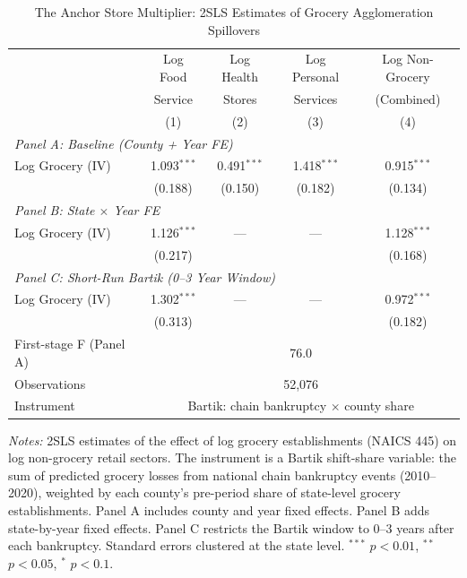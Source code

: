 \begin{table}[htbp]
\centering
\caption{The Anchor Store Multiplier: 2SLS Estimates of Grocery Agglomeration Spillovers}
\label{tab:iv}
\small
\begin{tabular}{lcccc}
\hline\hline
 & Log Food & Log Health & Log Personal & Log Non-Grocery \\
 & Service & Stores & Services & (Combined) \\
 & (1) & (2) & (3) & (4) \\
\hline
\multicolumn{5}{l}{\textit{Panel A: Baseline (County + Year FE)}} \\
[3pt]
Log Grocery (IV) & 1.093$^{***}$ & 0.491$^{***}$ & 1.418$^{***}$ & 0.915$^{***}$ \\
  & (0.188) & (0.150) & (0.182) & (0.134) \\
[6pt]
\multicolumn{5}{l}{\textit{Panel B: State $\times$ Year FE}} \\
[3pt]
Log Grocery (IV) & 1.126$^{***}$ & --- & --- & 1.128$^{***}$ \\
  & (0.217) &  &  & (0.168) \\
[6pt]
\multicolumn{5}{l}{\textit{Panel C: Short-Run Bartik (0--3 Year Window)}} \\
[3pt]
Log Grocery (IV) & 1.302$^{***}$ & --- & --- & 0.972$^{***}$ \\
  & (0.313) &  &  & (0.182) \\
\hline
First-stage F (Panel A) & \multicolumn{4}{c}{76.0} \\
Observations & \multicolumn{4}{c}{52,076} \\
Instrument & \multicolumn{4}{c}{Bartik: chain bankruptcy $\times$ county share} \\
\hline\hline
\end{tabular}
\begin{tablenotes}
\item \textit{Notes:} 2SLS estimates of the effect of log grocery establishments (NAICS 445) on log non-grocery retail sectors. The instrument is a Bartik shift-share variable: the sum of predicted grocery losses from national chain bankruptcy events (2010--2020), weighted by each county's pre-period share of state-level grocery establishments. Panel A includes county and year fixed effects. Panel B adds state-by-year fixed effects. Panel C restricts the Bartik window to 0--3 years after each bankruptcy. Standard errors clustered at the state level. $^{***}$ $p<0.01$, $^{**}$ $p<0.05$, $^{*}$ $p<0.1$.
\end{tablenotes}
\end{table}

